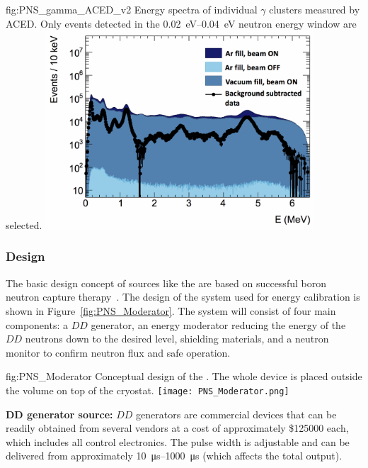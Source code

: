 \begin{dunefigure}{fig:PNS_gamma_ACED_v2}
{Energy spectra of individual $\gamma$ clusters measured by ACED. Only events detected in the \SIrange{0.02}{0.04}{eV} neutron energy window are selected.}
\includegraphics[width=10cm]{graphics/PNS_gamma_ACED_v2.png}
\end{dunefigure}


\subsubsection{Design}
\label{sec:dp-calib-sys-pns-des}

The basic design concept of sources like the  are based on successful boron neutron capture therapy~\cite{bib:Koivunoro2004}. The design of the  system used for energy calibration is shown in Figure~\ref{fig:PNS_Moderator}. The system will consist of four main components: a $DD$ generator, an energy moderator reducing the energy of the $DD$ neutrons down to the desired level, shielding materials, and a neutron monitor to confirm neutron flux and safe operation. 

\begin{dunefigure}{fig:PNS_Moderator}
{Conceptual design of the . The whole device is placed outside the  volume on top of the cryostat.}
\texttt{[image: PNS\_Moderator.png]}
\end{dunefigure}

{\bf DD generator source:} %
$DD$ generators are commercial devices that can be readily obtained from several vendors at a cost of approximately \$\num{125000} each, which includes all control electronics. The pulse width is adjustable and can be delivered from approximately \SIrange{10}{1000}{\micro\s} (which affects the total output). 

